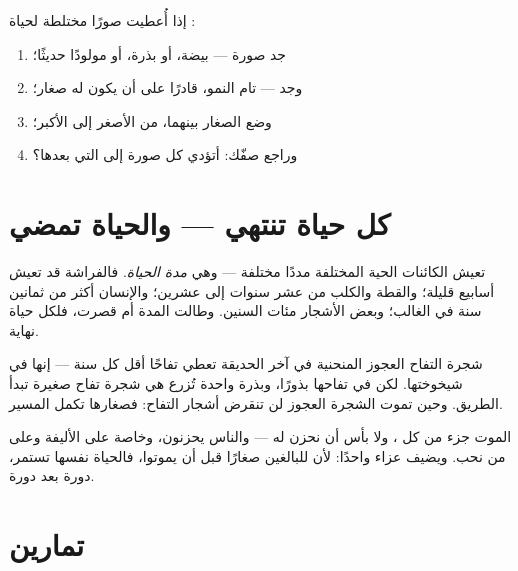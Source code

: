 \begin{method}\label{met:g2:born-grow-die:order}
إذا أُعطيت صورًا مختلطة لحياة :
\begin{enumerate}
  \item جد صورة  --- بيضة، أو بذرة، أو مولودًا حديثًا؛
  \item وجد  --- تام النمو، قادرًا على أن يكون له صغار؛
  \item وضع الصغار بينهما، من الأصغر إلى الأكبر؛
  \item وراجع صفّك: أتؤدي كل صورة إلى التي بعدها؟
\end{enumerate}
\end{method}

\section{كل حياة تنتهي --- والحياة تمضي}

\begin{proposition}\label{prop:g2:born-grow-die:lifespan}
تعيش الكائنات الحية المختلفة مددًا مختلفة --- وهي \emph{مدة
الحياة}. فالفراشة قد تعيش أسابيع قليلة؛ والقطة
والكلب من عشر سنوات إلى عشرين؛ والإنسان أكثر من ثمانين سنة في
الغالب؛ وبعض الأشجار مئات السنين. وطالت المدة أم قصرت، فلكل حياة
نهاية.
\end{proposition}
\admitted

\begin{example}\label{ex:g2:born-grow-die:oldtree}
شجرة التفاح العجوز المنحنية في آخر الحديقة تعطي تفاحًا أقل كل سنة
--- إنها في شيخوختها. لكن في تفاحها بذورًا، وبذرة واحدة تُزرع هي
شجرة تفاح صغيرة تبدأ الطريق. وحين تموت الشجرة العجوز لن تنقرض
أشجار التفاح: فصغارها تكمل المسير.
\end{example}

\begin{remark}\label{rem:g2:born-grow-die:death}
الموت جزء من كل ، ولا بأس أن نحزن له --- والناس يحزنون،
وخاصة على  الأليفة وعلى من نحب. ويضيف  عزاء
واحدًا: لأن للبالغين صغارًا قبل أن يموتوا، فالحياة نفسها تستمر،
دورة بعد دورة.
\end{remark}

\section{تمارين}

